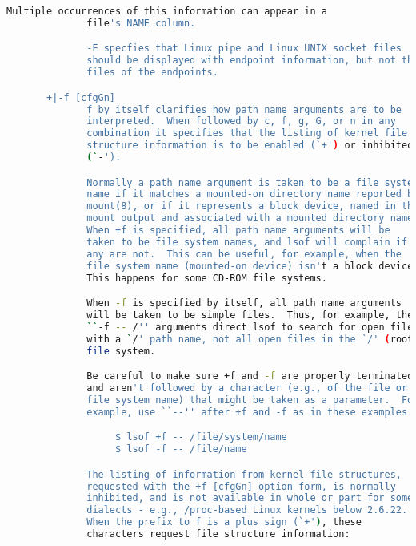 {{\begin{lstlisting}[language=bash]
              Multiple occurrences of this information can appear in a
              file's NAME column.

              -E specfies that Linux pipe and Linux UNIX socket files
              should be displayed with endpoint information, but not the
              files of the endpoints.

       +|-f [cfgGn]
              f by itself clarifies how path name arguments are to be
              interpreted.  When followed by c, f, g, G, or n in any
              combination it specifies that the listing of kernel file
              structure information is to be enabled (`+') or inhibited
              (`-').

              Normally a path name argument is taken to be a file system
              name if it matches a mounted-on directory name reported by
              mount(8), or if it represents a block device, named in the
              mount output and associated with a mounted directory name.
              When +f is specified, all path name arguments will be
              taken to be file system names, and lsof will complain if
              any are not.  This can be useful, for example, when the
              file system name (mounted-on device) isn't a block device.
              This happens for some CD-ROM file systems.

              When -f is specified by itself, all path name arguments
              will be taken to be simple files.  Thus, for example, the
              ``-f -- /'' arguments direct lsof to search for open files
              with a `/' path name, not all open files in the `/' (root)
              file system.

              Be careful to make sure +f and -f are properly terminated
              and aren't followed by a character (e.g., of the file or
              file system name) that might be taken as a parameter.  For
              example, use ``--'' after +f and -f as in these examples.

                   $ lsof +f -- /file/system/name
                   $ lsof -f -- /file/name

              The listing of information from kernel file structures,
              requested with the +f [cfgGn] option form, is normally
              inhibited, and is not available in whole or part for some
              dialects - e.g., /proc-based Linux kernels below 2.6.22.
              When the prefix to f is a plus sign (`+'), these
              characters request file structure information:


\end{lstlisting}}}
